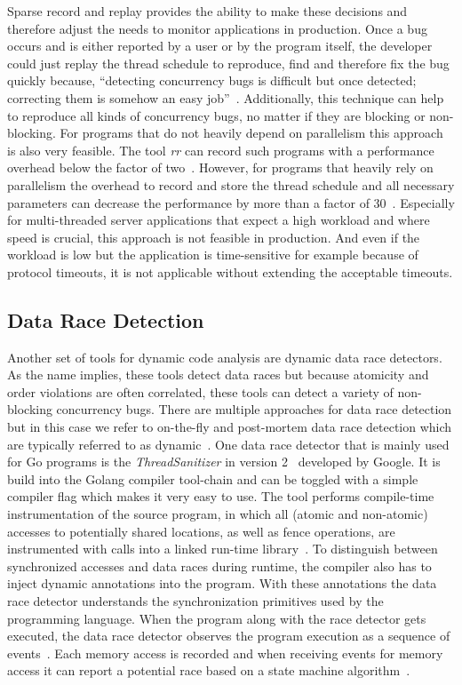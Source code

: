 \documentclass[conference]{IEEEtran}
\begin{document}
Sparse record and replay provides the ability to make these decisions and therefore adjust the needs to monitor applications in production.
Once a bug occurs and is either reported by a user or by the program itself, the developer could just replay the thread schedule to reproduce, find and therefore fix the bug quickly because, ``detecting concurrency bugs is difficult but once detected; correcting them is somehow an easy job''~\cite{tchamgoue2012testing}.
Additionally, this technique can help to reproduce all kinds of concurrency bugs, no matter if they are blocking or non-blocking.
For programs that do not heavily depend on parallelism this approach is also very feasible.
The tool \emph{rr} can record such programs with a performance overhead below the factor of two~\cite{o2017engineering}.
However, for programs that heavily rely on parallelism the overhead to record and store the thread schedule and all necessary parameters can decrease the performance by more than a factor of 30~\cite{o2017engineering}.
Especially for multi-threaded server applications that expect a high workload and where speed is crucial, this approach is not feasible in production.
And even if the workload is low but the application is time-sensitive for example because of protocol timeouts, it is not applicable without extending the acceptable timeouts.

\subsection{Data Race Detection}
Another set of tools for dynamic code analysis are dynamic data race detectors.
As the name implies, these tools detect data races but because atomicity and order violations are often correlated, these tools can detect a variety of non-blocking concurrency bugs.
There are multiple approaches for data race detection but in this case we refer to on-the-fly and post-mortem data race detection which are typically referred to as dynamic~\cite{serebry2009threadsanitizer}.
One data race detector that is mainly used for Go programs is the \emph{ThreadSanitizer} in version 2~\cite{threadSanitizer} developed by Google.
It is build into the Golang compiler tool-chain and can be toggled with a simple compiler flag which makes it very easy to use.
The tool performs compile-time instrumentation of the source program, in which all (atomic and non-atomic) accesses to potentially shared locations, as well as fence operations, are instrumented with calls into a linked run-time library~\cite{lidbury2019sparse}.
To distinguish between synchronized accesses and data races during runtime, the compiler also has to inject dynamic annotations into the program.
With these annotations the data race detector understands the synchronization primitives used by the programming language.
When the program along with the race detector gets executed, the data race detector observes the program execution as a sequence of events~\cite{serebry2009threadsanitizer}.
Each memory access is recorded and when receiving events for memory access it can report a potential race based on a state machine algorithm~\cite{serebry2011llvm}.
\end{document}
